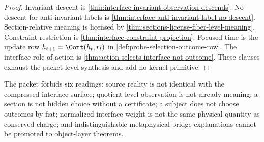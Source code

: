 \begin{proof}
Invariant descent is \autoref{thm:interface-invariant-observation-descends}.
No-descent for anti-invariant labels is
\autoref{thm:interface-anti-invariant-label-no-descent}. Section-relative
meaning is licensed by \autoref{thm:sections-license-fiber-level-meaning}.
Constraint restriction is \autoref{thm:interface-constraint-projection}.
Focused time is the update row $h_{t+1}=\Cont(h_t,r_t)$ in
\autoref{def:probe-selection-outcome-row}. The interface role of action is
\autoref{thm:action-selects-interface-not-outcome}. These clauses exhaust
the packet-level synthesis and add no kernel primitive.
\end{proof}

\begin{remark}
\label{rem:interface-constraint-section-forbidden-readings}
The packet forbids six readings: source reality is not identical with the
compressed interface surface; quotient-level observation is not already
meaning; a section is not hidden choice without a certificate; a subject
does not choose outcomes by fiat; normalized interface weight is not the
same physical quantity as conserved charge; and indistinguishable
metaphysical bridge explanations cannot be promoted to object-layer
theorems.
\end{remark}

